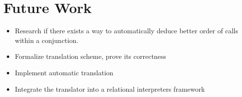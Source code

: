 \section{Future Work}

\begin{itemize}
  \item Research if there exists a way to automatically deduce better order of calls within a conjunction.
  \item Formalize translation scheme, prove its correctness
  \item Implement automatic translation
  \item Integrate the translator into a relational interpreters framework
\end{itemize}